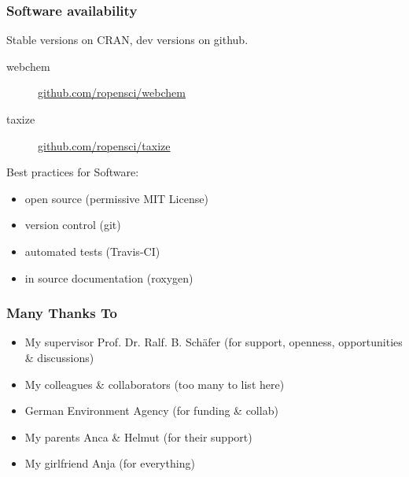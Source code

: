 \documentclass[
	12pt
	]{beamer}
\begin{document}
{%
\begin{frame}
\frametitle{Software availability}
	Stable versions on CRAN, dev versions on github.
	\begin{description}
		\item[webchem]{\url{github.com/ropensci/webchem}}
		\item[taxize]{\url{github.com/ropensci/taxize}}
	\end{description}
	\vspace{1em}

Best practices for Software:
	\begin{itemize}
		\item open source (permissive MIT License)
		\item version control (git)
		\item automated tests (Travis-CI)
		\item in source documentation (roxygen)
	\end{itemize}
\end{frame}
}

\begin{frame}
\frametitle{Many Thanks To}
	\begin{itemize}
		\item My supervisor \alert{Prof. Dr. Ralf. B. Schäfer} (for support, openness, opportunities \& discussions)
		\item My \alert{colleagues \& collaborators} (too many to list here)
		\item \alert{{G}erman Environment Agency} (for funding \& collab)
		\item My parents \alert{Anca \& Helmut} (for their support)
		\item My girlfriend \alert{Anja} (for everything)
	\end{itemize}
\end{frame}


\end{document}
